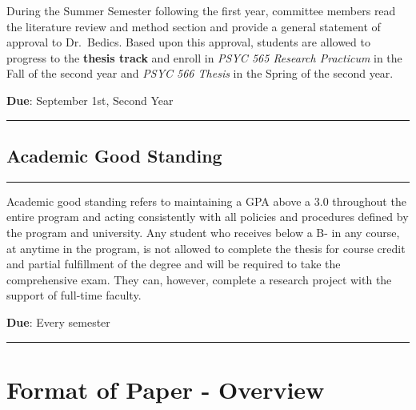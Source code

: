 \documentclass[openany]{book}
\begin{document}
During the Summer Semester following the first year, committee members read the literature review and method section and provide a general statement of approval to Dr.~Bedics. Based upon this approval, students are allowed to progress to the \textbf{thesis track} and enroll in \emph{PSYC 565 Research Practicum} in the Fall of the second year and \emph{PSYC 566 Thesis} in the Spring of the second year.

\textbf{Due}: September 1st, Second Year

\begin{center}\rule{0.5\linewidth}{0.5pt}\end{center}

\hypertarget{academic-good-standing}{%
\section{Academic Good Standing}\label{academic-good-standing}}

\begin{center}\rule{0.5\linewidth}{0.5pt}\end{center}

Academic good standing refers to maintaining a GPA above a 3.0 throughout the entire program and acting consistently with all policies and procedures defined by the program and university. Any student who receives below a B- in any course, at anytime in the program, is not allowed to complete the thesis for course credit and partial fulfillment of the degree and will be required to take the comprehensive exam. They can, however, complete a research project with the support of full-time faculty.

\textbf{Due}: Every semester

\begin{center}\rule{0.5\linewidth}{0.5pt}\end{center}

\hypertarget{format}{%
\chapter{Format of Paper - Overview}\label{format}}
\end{document}

